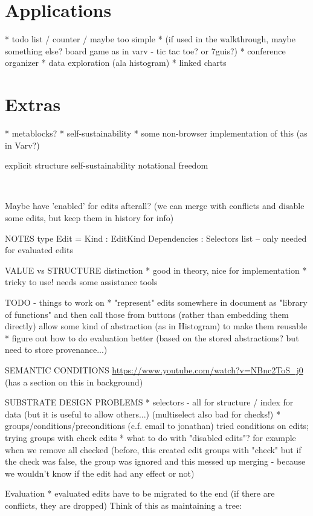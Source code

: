 \documentclass[sigconf]{acmart}
\begin{document}
\section{Applications}
* todo list / counter / maybe too simple
* (if used in the walkthrough, maybe something else? board game as in varv - tic tac toe? or 7guis?)
* conference organizer
* data exploration (ala histogram)
* linked charts

\section{Extras}
* metablocks?
* self-sustainability
* some non-browser implementation of this (as in Varv?)

explicit structure
self-sustainability
notational freedom

\newpage
~

Maybe have 'enabled' for edits afterall?
(we can merge with conflicts and disable some edits, but keep them in history for info)

NOTES
type Edit =
  { Kind : EditKind
    Dependencies : Selectors list }  -- only needed for evaluated edits

VALUE vs STRUCTURE distinction
* good in theory, nice for implementation
* tricky to use! needs some assistance tools

TODO - things to work on
* "represent" edits somewhere in document as "library of functions"
  and then call those from buttons (rather than embedding them directly)
  allow some kind of abstraction (as in Histogram) to make them reusable
* figure out how to do evaluation better
  (based on the stored abstractions? but need to store provenance...)

SEMANTIC CONDITIONS
\url{https://www.youtube.com/watch?v=NBnc2ToS_j0}
(has a section on this in background)

SUBSTRATE DESIGN PROBLEMS
* selectors - all for structure / index for data
  (but it is useful to allow others...)
  (multiselect also bad for checks!)
* groups/conditions/preconditions
  (c.f. email to jonathan)
  tried conditions on edits; trying groups with check edits
* what to do with "disabled edits"? for example when we remove all checked
  (before, this created edit groups with "check" but if the check was false,
  the group was ignored and this messed up merging - because we wouldn't know if the
  edit had any effect or not)

Evaluation
* evaluated edits have to be migrated to the end
  (if there are conflicts, they are dropped)
  Think of this as maintaining a tree:
\end{document}
